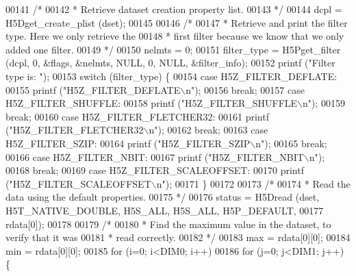 \begin{DoxyCode}
{{00141     \textcolor{comment}{/*}
00142 \textcolor{comment}{     * Retrieve dataset creation property list.}
00143 \textcolor{comment}{     */}
00144     dcpl = H5Dget\_create\_plist (dset);
00145 
00146     \textcolor{comment}{/*}
00147 \textcolor{comment}{     * Retrieve and print the filter type.  Here we only retrieve the}
00148 \textcolor{comment}{     * first filter because we know that we only added one filter.}
00149 \textcolor{comment}{     */}
00150     nelmts = 0;
00151     filter\_type = H5Pget\_filter (dcpl, 0, &flags, &nelmts, NULL, 0, NULL, &filter\_info);
00152     printf (\textcolor{stringliteral}{"Filter type is: "});
00153     \textcolor{keywordflow}{switch} (filter\_type) \{
00154         \textcolor{keywordflow}{case} H5Z\_FILTER\_DEFLATE:
00155             printf (\textcolor{stringliteral}{"H5Z\_FILTER\_DEFLATE\(\backslash\)n"});
00156             \textcolor{keywordflow}{break};
00157         \textcolor{keywordflow}{case} H5Z\_FILTER\_SHUFFLE:
00158             printf (\textcolor{stringliteral}{"H5Z\_FILTER\_SHUFFLE\(\backslash\)n"});
00159             \textcolor{keywordflow}{break};
00160         \textcolor{keywordflow}{case} H5Z\_FILTER\_FLETCHER32:
00161             printf (\textcolor{stringliteral}{"H5Z\_FILTER\_FLETCHER32\(\backslash\)n"});
00162             \textcolor{keywordflow}{break};
00163         \textcolor{keywordflow}{case} H5Z\_FILTER\_SZIP:
00164             printf (\textcolor{stringliteral}{"H5Z\_FILTER\_SZIP\(\backslash\)n"});
00165             \textcolor{keywordflow}{break};
00166         \textcolor{keywordflow}{case} H5Z\_FILTER\_NBIT:
00167             printf (\textcolor{stringliteral}{"H5Z\_FILTER\_NBIT\(\backslash\)n"});
00168             \textcolor{keywordflow}{break};
00169         \textcolor{keywordflow}{case} H5Z\_FILTER\_SCALEOFFSET:
00170             printf (\textcolor{stringliteral}{"H5Z\_FILTER\_SCALEOFFSET\(\backslash\)n"});
00171     \}
00172 
00173     \textcolor{comment}{/*}
00174 \textcolor{comment}{     * Read the data using the default properties.}
00175 \textcolor{comment}{     */}
00176     status = H5Dread (dset, H5T\_NATIVE\_DOUBLE, H5S\_ALL, H5S\_ALL, H5P\_DEFAULT,
00177                 rdata[0]);
00178 
00179     \textcolor{comment}{/*}
00180 \textcolor{comment}{     * Find the maximum value in the dataset, to verify that it was}
00181 \textcolor{comment}{     * read correctly.}
00182 \textcolor{comment}{     */}
00183     max = rdata[0][0];
00184     min = rdata[0][0];
00185     \textcolor{keywordflow}{for} (i=0; i<DIM0; i++)
00186         \textcolor{keywordflow}{for} (j=0; j<DIM1; j++) \{
}}
\end{DoxyCode}
